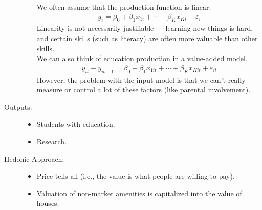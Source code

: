 \documentclass[10pt]{extarticle}
\begin{document}
\begin{description}
\begin{itemize}
          We often assume that the production function is linear.
          \begin{align*}
            y_i = \beta_0 + \beta_1x_{1i} + \cdots + \beta_Kx_{Ki} + \varepsilon_i
          \end{align*}
          Linearity is not necessarily justifiable --- learning new things is hard, and certain skills (such as literacy) are often more valuable than other skills.\\

          We can also think of education production in a value-added model.
          \begin{align*}
            y_{it} - y_{it-1} = \beta_0 + \beta_1x_{1it} + \cdots + \beta_Kx_{Kit} + \varepsilon_{it}
          \end{align*}
          However, the problem with the input model is that we can't really measure or control a lot of these factors (like parental involvement).
      \end{itemize}
    \item[Outputs:]\hfill
      \begin{itemize}
        \item Students with education.
        \item Research.
      \end{itemize}
    \item[Hedonic Approach:]\hfill
      \begin{itemize}
        \item Price tells all (i.e., the value is what people are willing to pay).
        \item Valuation of non-market amenities is capitalized into the value of houses.
      \end{itemize}
  \end{description}
\end{document}
